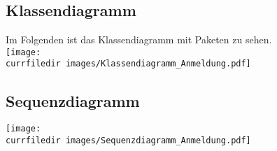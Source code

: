 \begin{samepage}
    \subsection{Klassendiagramm}\label{App_Anmeldung_Klassendiagramm}
    Im Folgenden ist das Klassendiagramm mit Paketen zu sehen.\\
    \texttt{[image: \\currfiledir images/Klassendiagramm\_Anmeldung.pdf]}

\end{samepage}
\begin{samepage}
    \subsection{Sequenzdiagramm}\label{App_Anmeldung_Sequenzdiagramm}
    
    \texttt{[image: \\currfiledir images/Sequenzdiagramm\_Anmeldung.pdf]}

\end{samepage}